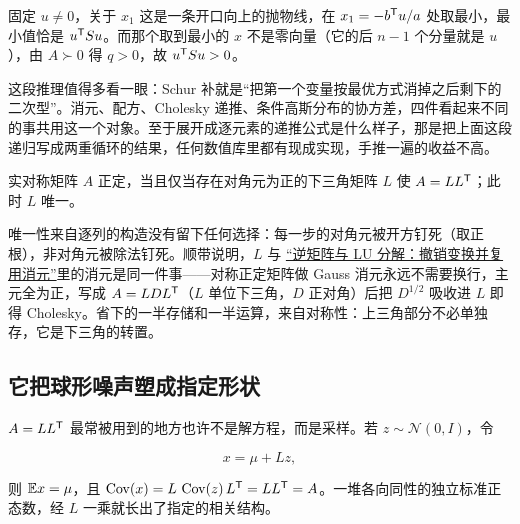 固定 \(u\ne0\)，关于 \(x_1\) 这是一条开口向上的抛物线，在 \(x_1=-b^{\mathsf{T}}u/a\) 处取最小，最小值恰是 \(u^{\mathsf{T}}Su\)。而那个取到最小的 \(x\) 不是零向量（它的后 \(n-1\) 个分量就是 \(u\)），由 \(A\succ0\) 得 \(q>0\)，故 \(u^{\mathsf{T}}Su>0\)。

这段推理值得多看一眼：Schur 补就是``把第一个变量按最优方式消掉之后剩下的二次型''。消元、配方、Cholesky 递推、条件高斯分布的协方差，四件看起来不同的事共用这一个对象。至于展开成逐元素的递推公式是什么样子，那是把上面这段递归写成两重循环的结果，任何数值库里都有现成实现，手推一遍的收益不高。

\begin{proposition}
实对称矩阵 \(A\) 正定，当且仅当存在对角元为正的下三角矩阵 \(L\) 使 \(A=LL^{\mathsf{T}}\)；此时 \(L\) 唯一。
\end{proposition}

唯一性来自逐列的构造没有留下任何选择：每一步的对角元被开方钉死（取正根），非对角元被除法钉死。顺带说明，\(L\) 与 \hyperref[sec:03-Linear-Algebra/01-Linear-Systems-and-Matrices/03]{``逆矩阵与 LU 分解：撤销变换并复用消元''}里的消元是同一件事——对称正定矩阵做 Gauss 消元永远不需要换行，主元全为正，写成 \(A=LDL^{\mathsf{T}}\)（\(L\) 单位下三角，\(D\) 正对角）后把 \(D^{1/2}\) 吸收进 \(L\) 即得 Cholesky。省下的一半存储和一半运算，来自对称性：上三角部分不必单独存，它是下三角的转置。

\subsection{它把球形噪声塑成指定形状}

\(A=LL^{\mathsf{T}}\) 最常被用到的地方也许不是解方程，而是采样。若 \(z\sim\mathcal N(0,I)\)，令

\[
x=\mu+Lz,
\]

则 \(\mathbb{E} x=\mu\)，且 \(\operatorname{Cov}(x)=L\,\operatorname{Cov}(z)\,L^{\mathsf{T}}=LL^{\mathsf{T}}=A\)。一堆各向同性的独立标准正态数，经 \(L\) 一乘就长出了指定的相关结构。


